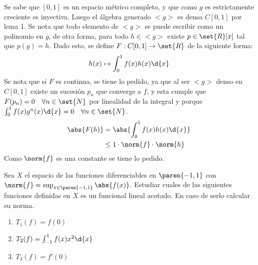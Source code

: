 \begin{sol}
    Se sabe que \([0,1]\) es un espacio métrico completo, y que como \(g\) es estrictamente creciente es inyectiva. Luego el álgebra generado \(<g>\) es densa \(C[0,1]\) por lema 1. Se nota que todo elemento de \(<g>\) se puede escribir como un polinomio en \(g\), de otra forma, para todo \(h\in<g>\) existe \(p\in\set{R}[x]\) tal que \(p(g)=h\). Dado esto, se define \(F:C[0,1]\rightarrow\set{R}\) de la siguiente forma:
    \[
        h(x)\mapsto\int_0^1f(x)h(x)\d{x}
    \]
    Se nota que si \(F\) es continua, se tiene lo pedido, ya que al ser \(<g>\) denso en \(C[0,1]\) existe un sucesión \(p_n\) que converge a \(f\), y esta cumple que \(F(p_n)=0\quad\forall n\in\set{N}\) por linealidad de la integral y porque \(\int_0^1f(x)g^n(x)\d{x}=0\quad\forall n\in\set{N}\).
    \begin{align*}
        \abs{F(h)} & =\abs{\int_0^1f(x)h(x)\d{x}} \\
                   & \leq 1\cdot\norm{f}\cdot\norm{h}\\
    \end{align*}
    Como \(\norm{f}\) es una constante se tiene lo pedido.
\end{sol}

\begin{prob}
    Sea \(X\) el espacio de las funciones diferenciables en \(\paren{-1,1}\) con \(\norm{f}=\sup_{x\in\paren{-1,1}}\abs{f(x)}\). Estudiar cuales de las siguientes funciones definidas en \(X\) es un funcional lineal acotado. En caso de serlo calcular su norma.
    \begin{enumerate}
        \item \(T_1(f)=f(0)\)
        \item \(T_2(f)=\int_{-1}^1f(x)x^2\d{x}\)
        \item \(T_3(f)=f'(0)\)
    \end{enumerate}
\end{prob}


